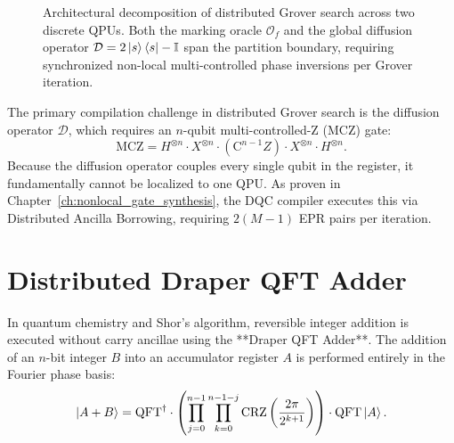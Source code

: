 \begin{figure}[htbp]
    \caption{Architectural decomposition of distributed Grover search across two discrete QPUs. Both the marking oracle $\mathcal{O}_f$ and the global diffusion operator $\mathcal{D} = 2\ket{s}\bra{s} - \mathbb{I}$ span the partition boundary, requiring synchronized non-local multi-controlled phase inversions per Grover iteration.}
    \label{fig:distributed_grover_architecture}
\end{figure}

The primary compilation challenge in distributed Grover search is the diffusion operator $\mathcal{D}$, which requires an $n$-qubit multi-controlled-Z (MCZ) gate:
\begin{equation}
    \text{MCZ} = H^{\otimes n} \cdot X^{\otimes n} \cdot \left( \text{C}^{n-1}Z \right) \cdot X^{\otimes n} \cdot H^{\otimes n}.
\end{equation}
Because the diffusion operator couples every single qubit in the register, it fundamentally cannot be localized to one QPU. As proven in Chapter~\ref{ch:nonlocal_gate_synthesis}, the DQC compiler executes this via Distributed Ancilla Borrowing, requiring $2(M-1)$ EPR pairs per iteration.

\section{Distributed Draper QFT Adder}
\label{sec:draper_adder}

In quantum chemistry and Shor's algorithm, reversible integer addition is executed without carry ancillae using the **Draper QFT Adder**. The addition of an $n$-bit integer $B$ into an accumulator register $A$ is performed entirely in the Fourier phase basis:
\begin{equation}
    \ket{A + B} = \text{QFT}^\dagger \cdot \left( \prod_{j=0}^{n-1} \prod_{k=0}^{n-1-j} \text{CRZ}\left( \frac{2\pi}{2^{k+1}} \right) \right) \cdot \text{QFT} \ket{A}.
    \label{eq:draper_math}
\end{equation}

